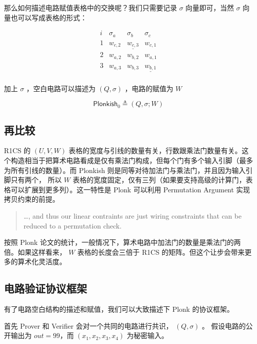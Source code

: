 那么如何描述电路赋值表格中的交换呢？我们只需要记录 \(\sigma\)
向量即可，当然 \(\sigma\) 向量也可以写成表格的形式：

\[
\begin{array}{c|c|c|c|}
i & \sigma_a & \sigma_b & \sigma_c  \\
\hline
1 & \boxed{w_{c,2}} & \underline{w_{c,3}}& w_{c,1} \\
2 & w_{a,2} & w_{b,2} & \boxed{w_{a,1}} \\
3 & w_{a,3} & w_{b,3} & \underline{w_{b,1}} \\
\end{array}
\]

加上 \(\sigma\) ，空白电路可以描述为 \((Q,\sigma)\) ，电路的赋值为 \(W\)

\[
\mathsf{Plonkish}_0 \triangleq (Q, \sigma; W)
\]

\hypertarget{ux518dux6bd4ux8f83}{%
\subsection{再比较}\label{ux518dux6bd4ux8f83}}

R1CS 的 \((U,V,W)\)
表格的宽度与引线的数量有关，行数跟乘法门数量有关。这个构造相当于把算术电路看成是仅有乘法门构成，但每个门有多个输入引脚（最多为所有引线的数量）。而
Plonkish 则是同等对待加法门与乘法门，并且因为输入引脚只有两个， 所以
\(W\)
表格的宽度固定，仅有三列（如果要支持高级的计算门，表格可以扩展到更多列）。这一特性是
Plonk 可以利用 Permutation Argument 实现拷贝约束的前提。

\begin{quote}
\ldots, and thus our linear contraints are just wiring constraints that
can be reduced to a permutation check.
\end{quote}

按照 Plonk
论文的统计，一般情况下，算术电路中加法门的数量是乘法门的两倍。如果这样看来，
\(W\) 表格的长度会三倍于 R1CS
的矩阵。但这个让步会带来更多的算术化灵活度。

\hypertarget{ux7535ux8defux9a8cux8bc1ux534fux8baeux6846ux67b6}{%
\subsection{电路验证协议框架}\label{ux7535ux8defux9a8cux8bc1ux534fux8baeux6846ux67b6}}

有了电路空白结构的描述和赋值，我们可以大致描述下 Plonk 的协议框架。

首先 Prover 和 Verifier 会对一个共同的电路进行共识， \((Q,\sigma)\) 。
假设电路的公开输出为 \(out=99\)，而 \((x_1,x_2,x_3,x_4)\) 为秘密输入。


